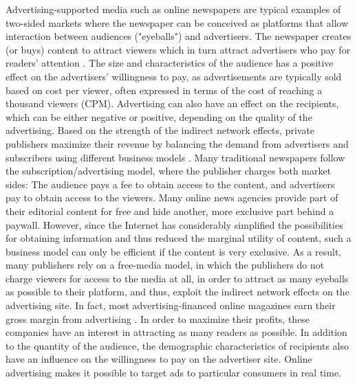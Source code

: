 \documentclass[12pt,a4paper,notitlepage]{article}
\begin{document}
Advertising-supported media such as online newspapers are typical examples of two-sided markets where the newspaper can be conceived as platforms that allow interaction between audiences ("eyeballs") and advertisers. The newspaper creates (or buys) content to attract viewers which in turn attract advertisers who pay for readers' attention \citep{evans_industrial_2005}. The size and characteristics of the audience has a positive effect on the advertisers' willingness to pay, as advertisements are typically sold based on cost per viewer, often expressed in terms of the cost of reaching a thousand viewers (CPM). Advertising can also have an effect on the recipients, which can be either negative or positive, depending on the quality of the advertising. Based on the strength of the indirect network effects, private publishers maximize their revenue by balancing the demand from advertisers and subscribers using different business models \citep{evans_economics_2008}. Many traditional newspapers follow the subscription/advertising model, where the publisher charges both market sides: The audience pays a fee to obtain access to the content, and advertisers pay to obtain access to the viewers. Many online news agencies provide part of their editorial content for free and hide another, more exclusive part behind a paywall. However, since the Internet has considerably simplified the possibilities for obtaining information and thus reduced the marginal utility of content, such a business model can only be efficient if the content is very exclusive. As a result, many publishers rely on a free-media model, in which the publishers do not charge viewers for access to the media at all, in order to attract as many eyeballs as possible to their platform, and thus, exploit the indirect network effects on the advertising site. In fact, most advertising-financed online magazines earn their gross margin from advertising \citep{evans_industrial_2005}. In order to maximize their profits, these companies have an interest in attracting as many readers as possible. In addition to the quantity of the audience, the demographic characteristics of recipients also have an influence on the willingness to pay on the advertiser site. Online advertising makes it possible to target ads to particular consumers in real time.
 
\end{document}
